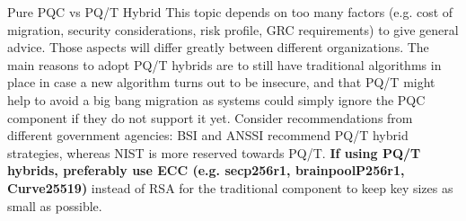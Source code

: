 \begin{minipage}[t]{0.7\textwidth}
\begin{algorithmbox}{Pure PQC vs PQ/T Hybrid}
        This topic depends on too many factors (e.g. cost of migration, security considerations, risk profile, GRC requirements) to give general advice. Those aspects will differ greatly between different organizations. The main reasons to adopt PQ/T hybrids are to still have traditional algorithms in place in case a new algorithm turns out to be insecure, and that PQ/T might help to avoid a big bang migration as systems could simply ignore the PQC component if they do not support it yet. Consider recommendations from different government agencies: BSI and ANSSI recommend PQ/T hybrid strategies, whereas NIST is more reserved towards PQ/T. {\bfseries If using PQ/T hybrids, preferably use  ECC (e.g. secp256r1, brainpoolP256r1, Curve25519)} instead of RSA for the traditional component to keep key sizes as small as possible.%
    \end{algorithmbox}
\end{minipage}
